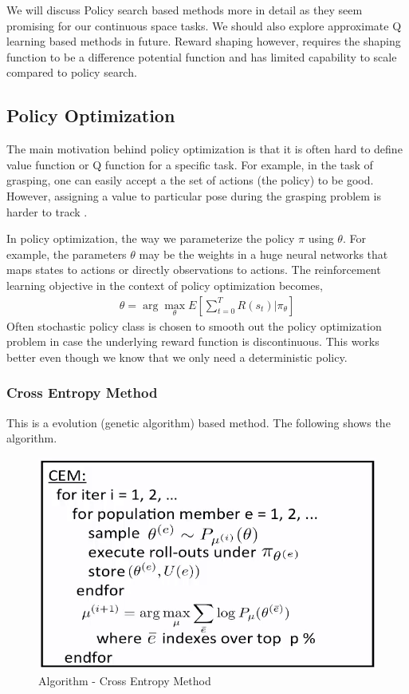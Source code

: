 \documentclass[11pt]{article}
\begin{document}
We will discuss Policy search based methods more in detail as they seem promising for our continuous space tasks. We should also explore approximate Q learning based methods in future. Reward shaping however, requires the shaping function to be a difference potential function and has limited capability to scale compared to policy search. 



\subsection{Policy Optimization}
The main motivation behind policy optimization is that it is often hard to define value function or Q function for a specific task. For example, in the task of grasping, one can easily accept a the set of actions (the policy) to be good. However, assigning a value to particular pose during the grasping problem is harder to track \cite{drlnips}. 


 In policy optimization, the way we parameterize the policy $\pi$ using $\theta$. For example, the parameters $\theta$ may be the weights in a huge neural networks that maps states to actions or directly observations to actions. The reinforcement learning objective in the context of policy optimization becomes, 
\begin{align}
  \theta = \arg \max_\theta E[\sum_{t=0}^TR(s_t)|\pi_\theta]
\end{align}
Often stochastic policy class is chosen to smooth out the policy optimization problem in case the underlying reward function is discontinuous. This works better even though we know that we only need a deterministic policy. 

\subsubsection{Cross Entropy Method}

This is a evolution (genetic algorithm) based method. The following shows the algorithm.  

\begin{figure}[H]
  \begin{center}
    \includegraphics[width=0.7\linewidth]{images/cem.png}
    \caption{Algorithm - Cross Entropy Method}
    \label{fig:cem}
  \end{center}
\end{figure}
 
\end{document}
